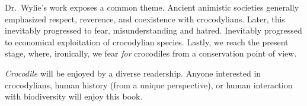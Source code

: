 \documentclass[letterpaper,12pt]{article}
\newcommand{\croc}{\emph{Crocodile}\xspace}
\begin{document}
Dr.\ Wylie's work exposes a common theme. Ancient animistic societies generally
emphasized respect, reverence, and coexistence with crocodylians.
Later, this inevitably progressed to fear, misunderstanding and hatred.
Inevitably progressed to economical exploitation of crocodylian species.
Lastly, we reach the present stage, where, ironically, we fear \emph{for}
crocodiles from a conservation point of view.

\croc will be enjoyed by a diverse readership. Anyone interested in
crocodylians, human history (from a unique perspective), or human interaction
with biodiversity will enjoy this book.




\end{document}
